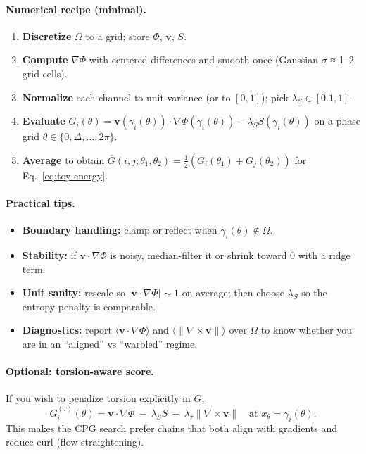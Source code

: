 \documentclass[a4paper,11pt]{article}
\begin{document}
\paragraph{Numerical recipe (minimal).}
\begin{enumerate}
\item \textbf{Discretize} \(\Omega\) to a grid; store \(\Phi\), \(\mathbf v\), \(S\).
\item \textbf{Compute} \(\nabla\Phi\) with centered differences and smooth once (Gaussian \(\sigma\) ≈ 1–2 grid cells).
\item \textbf{Normalize} each channel to unit variance (or to \([0,1]\)); pick \(\lambda_S\in[0.1,1]\).
\item \textbf{Evaluate} \(G_i(\theta)=\mathbf v(\gamma_i(\theta))\cdot \nabla\Phi(\gamma_i(\theta))-\lambda_S S(\gamma_i(\theta))\) on a phase grid \(\theta\in\{0,\Delta,\dots,2\pi\}\).
\item \textbf{Average} to obtain \(\overline{G}(i,j;\theta_1,\theta_2)=\tfrac{1}{2}(G_i(\theta_1)+G_j(\theta_2))\) for Eq.~\eqref{eq:toy-energy}.
\end{enumerate}

\paragraph{Practical tips.}
\begin{itemize}
\item \textbf{Boundary handling:} clamp or reflect when \(\gamma_i(\theta)\notin\Omega\).
\item \textbf{Stability:} if \(\mathbf v\cdot\nabla\Phi\) is noisy, median-filter it or shrink toward 0 with a ridge term.
\item \textbf{Unit sanity:} rescale so \(|\mathbf v\cdot\nabla\Phi|\sim 1\) on average; then choose \(\lambda_S\) so the entropy penalty is comparable.
\item \textbf{Diagnostics:} report $\langle \mathbf v\cdot\nabla\Phi\rangle$ and $\langle \|\nabla\times\mathbf v\|\rangle$ over \(\Omega\) to know whether you are in an “aligned” vs “warbled” regime.
\end{itemize}

\paragraph{Optional: torsion-aware score.}
If you wish to penalize torsion explicitly in \(G\),
\[
G_i^{(\tau)}(\theta)=
\mathbf v\!\cdot\!\nabla\Phi\ -\ \lambda_S S\ -\ \lambda_\tau \big\|\nabla\times\mathbf v\big\|
\quad\text{at }x_\theta=\gamma_i(\theta).
\]
This makes the CPG search prefer chains that both align with gradients and reduce curl (flow straightening).
\end{document}
